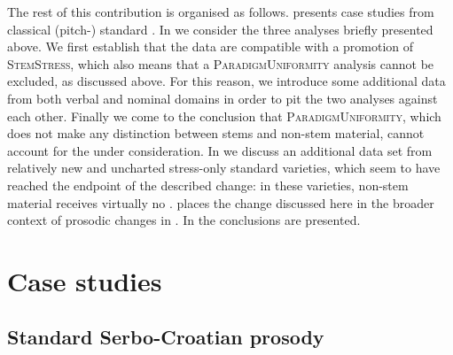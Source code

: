 \documentclass[output=paper,nonflat,colorlinks,citecolor=brown,newtxmath]{langsci/langscibook}
\begin{document}
The rest of this contribution is organised as follows.  presents case studies from classical (pitch-) standard . In   we consider the three analyses briefly presented above. We first establish that the data are compatible with a promotion of \textsc{StemStress}, which also means that a \textsc{ParadigmUniformity} analysis cannot be excluded, as discussed above. For this reason, we introduce some additional data from both verbal and nominal domains in order to pit the two analyses against each other. Finally we come to the conclusion that \textsc{ParadigmUniformity}, which does not make any distinction between stems and non-stem material, cannot account for the  under consideration. In  we discuss an additional data set from relatively new and uncharted stress-only standard varieties, which seem to have reached the endpoint of the described change: in these varieties, non-stem material receives virtually no .  places the change discussed here in the broader context of prosodic changes in . In  the conclusions are presented.

\section{Case studies} \label{sec:kager:2}
\subsection{Standard Serbo-Croatian prosody} \label{sec:kager:subsec21}
\end{document}
